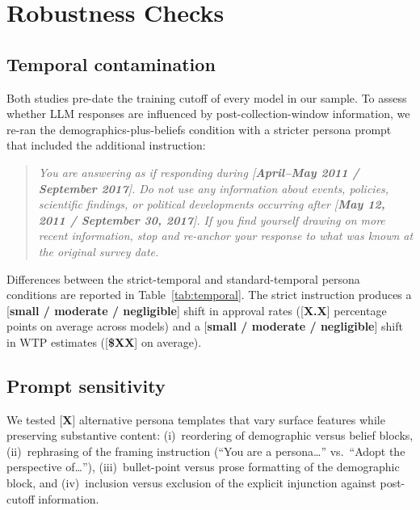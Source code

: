 \documentclass[12pt]{article}
\begin{document}
\section{Robustness Checks}\label{app:robustness}

\subsection{Temporal contamination}

Both studies pre-date the training cutoff of every model in our sample. To assess whether LLM responses are influenced by post-collection-window information, we re-ran the demographics-plus-beliefs condition with a stricter persona prompt that included the additional instruction:

\begin{quote}\itshape
\footnotesize
You are answering as if responding during [\textbf{April--May 2011 / September 2017}]. Do not use any information about events, policies, scientific findings, or political developments occurring after [\textbf{May 12, 2011 / September 30, 2017}]. If you find yourself drawing on more recent information, stop and re-anchor your response to what was known at the original survey date.
\end{quote}

Differences between the strict-temporal and standard-temporal persona conditions are reported in Table~\ref{tab:temporal}. The strict instruction produces a [\textbf{small / moderate / negligible}] shift in approval rates ([\textbf{X.X}] percentage points on average across models) and a [\textbf{small / moderate / negligible}] shift in WTP estimates ([\textbf{\$XX}] on average).

\label{tab:temporal}

\subsection{Prompt sensitivity}

We tested [\textbf{X}] alternative persona templates that vary surface features while preserving substantive content: (i)~reordering of demographic versus belief blocks, (ii)~rephrasing of the framing instruction (``You are a persona\dots'' vs.\ ``Adopt the perspective of\dots''), (iii)~bullet-point versus prose formatting of the demographic block, and (iv)~inclusion versus exclusion of the explicit injunction against post-cutoff information.
\end{document}
